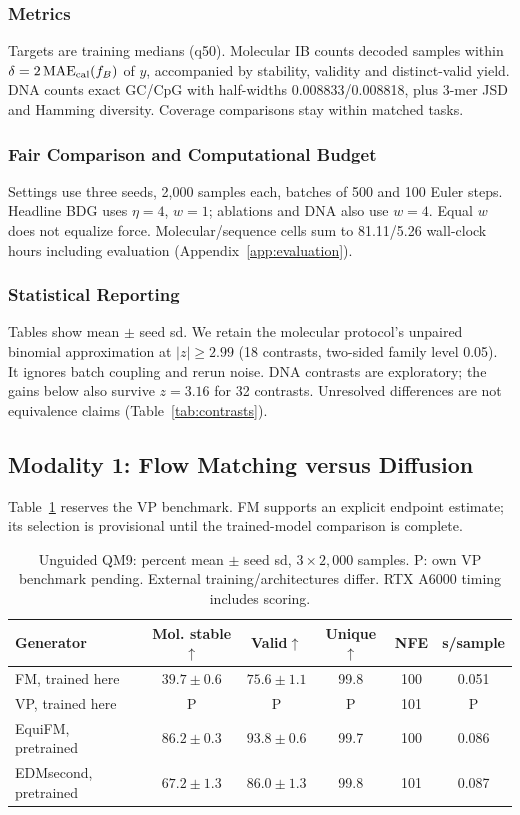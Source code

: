 \documentclass{article}
\newcommand{\pend}{\textsf{P}}
\begin{document}
\subsubsection{Metrics}
Targets are training medians (q50). Molecular IB counts decoded samples within $\delta=2\operatorname{MAE}_{\rm cal}(f_B)$ of $y$, accompanied by stability, validity and distinct-valid yield. DNA counts exact GC/CpG with half-widths 0.008833/0.008818, plus 3-mer JSD and Hamming diversity. Coverage comparisons stay within matched tasks.
\subsubsection{Fair Comparison and Computational Budget}
Settings use three seeds, 2,000 samples each, batches of 500 and 100 Euler steps. Headline BDG uses $\eta=4$, $w=1$; ablations and DNA also use $w=4$. Equal $w$ does not equalize force. Molecular/sequence cells sum to 81.11/5.26 wall-clock hours including evaluation (Appendix~\ref{app:evaluation}).
\subsubsection{Statistical Reporting}
Tables show mean $\pm$ seed sd. We retain the molecular protocol's unpaired binomial approximation at $|z|\ge2.99$ (18 contrasts, two-sided family level 0.05). It ignores batch coupling and rerun noise. DNA contrasts are exploratory; the gains below also survive $z=3.16$ for 32 contrasts. Unresolved differences are not equivalence claims (Table~\ref{tab:contrasts}).

\subsection{Modality 1: Flow Matching versus Diffusion}\label{sec:fmvd}
Table~\ref{tab:fmvd} reserves the VP benchmark. FM supports an explicit endpoint estimate; its selection is provisional until the trained-model comparison is complete.
\begin{table}[!htbp]
\centering\small
\caption{Unguided QM9: percent mean $\pm$ seed sd, $3\times2{,}000$ samples. P: own VP benchmark pending. External training/architectures differ. RTX A6000 timing includes scoring.}
\label{tab:fmvd}
\begin{tabular}{lccccc}
\toprule
Generator & Mol. stable$\uparrow$ & Valid$\uparrow$ & Unique$\uparrow$ & NFE & s/sample\\
\midrule
FM, trained here & $39.7\pm0.6$ & $75.6\pm1.1$ & 99.8 & 100 & 0.051\\
VP, trained here & \pend & \pend & \pend & 101 & \pend\\
\midrule
EquiFM, pretrained & $86.2\pm0.3$ & $93.8\pm0.6$ & 99.7 & 100 & 0.086\\
EDMsecond, pretrained & $67.2\pm1.3$ & $86.0\pm1.3$ & 99.8 & 101 & 0.087\\
\bottomrule
\end{tabular}
\end{table}
\end{document}
